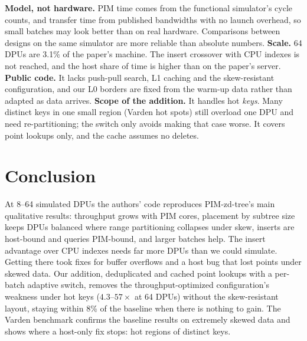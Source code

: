 \documentclass[conference]{IEEEtran}
\begin{document}
\textbf{Model, not hardware.} PIM time comes from the functional simulator's cycle counts, and transfer time from
published bandwidths with no launch overhead, so small batches may look better than on real hardware. Comparisons
between designs on the same simulator are more reliable than absolute numbers.
\textbf{Scale.} 64 DPUs are 3.1\% of the paper's machine. The insert crossover with CPU indexes is not reached, and
the host share of time is higher than on the paper's server.
\textbf{Public code.} It lacks push-pull search, L1 caching and the skew-resistant configuration, and our L0 borders
are fixed from the warm-up data rather than adapted as data arrives.
\textbf{Scope of the addition.} It handles hot \emph{keys}. Many distinct keys in one small region (Varden hot spots)
still overload one DPU and need re-partitioning; the switch only avoids making that case worse. It covers point
lookups only, and the cache assumes no deletes.

\section{Conclusion}

At 8--64 simulated DPUs the authors' code reproduces PIM-zd-tree's main qualitative results: throughput grows with
PIM cores, placement by subtree size keeps DPUs balanced where range partitioning collapses under skew, inserts are
host-bound and queries PIM-bound, and larger batches help. The insert advantage over CPU indexes needs far more DPUs
than we could simulate. Getting there took fixes for buffer overflows and a host bug that lost points under skewed
data. Our addition, deduplicated and cached point lookups with a per-batch adaptive switch, removes the
throughput-optimized configuration's weakness under hot keys ($4.3$--$57\times$ at 64 DPUs) without the
skew-resistant layout, staying within 8\% of the baseline when there is nothing to gain. The Varden benchmark confirms
the baseline results on extremely skewed data and shows where a host-only fix stops: hot regions of distinct keys.



\end{document}
